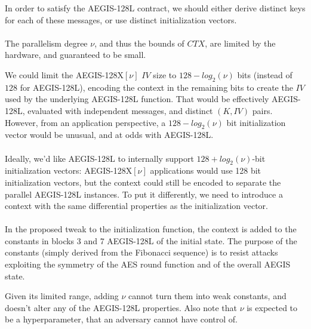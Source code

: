 \documentclass[envcountsame,runningheads,notitlepage]{llncs}
\begin{document}
In order to satisfy the AEGIS-128L contract, we should either derive distinct keys for each of these messages, or use distinct initialization vectors.

\paragraph{}

The parallelism degree $\nu$, and thus the bounds of $CTX$, are limited by the hardware, and guaranteed to be small.

We could limit the AEGIS-128X$[\nu]$ $IV$ size to $128-log_2(\nu)$ bits (instead of $128$ for AEGIS-128L), encoding the context in the remaining bits to create the $IV$ used by the underlying AEGIS-128L function.
That would be effectively AEGIS-128L, evaluated with independent messages, and distinct $(K, IV)$ pairs.
However, from an application perspective, a $128-log_2(\nu)$ bit initialization vector would be unusual, and at odds with AEGIS-128L.

\paragraph{}

Ideally, we'd like AEGIS-128L to internally support $128+log_2(\nu)$-bit initialization vectors: AEGIS-128X$[\nu]$ applications would use 128 bit initialization vectors, but the context could still be encoded to separate the parallel AEGIS-128L instances.
To put it differently, we need to introduce a context with the same differential properties as the initialization vector.

\paragraph{}

In the proposed tweak to the initialization function, the context is added to the constants in blocks 3 and 7 AEGIS-128L of the initial state.
The purpose of the constants (simply derived from the Fibonacci sequence) is to resist attacks exploiting the symmetry of the AES round function and of the overall AEGIS state.

Given its limited range, adding $\nu$ cannot turn them into weak constants, and doesn't alter any of the AEGIS-128L properties.
Also note that $\nu$ is expected to be a hyperparameter, that an adversary cannot have control of.

\paragraph{}
\end{document}
